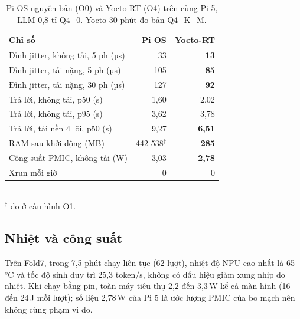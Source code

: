 \documentclass[a4paper,12pt,twocolumn]{article}
\begin{document}
\begin{table}[t]\centering\small
\caption{Pi OS nguyên bản (O0) và Yocto-RT (O4) trên cùng Pi 5, LLM 0,8 tỉ Q4\_0. Yocto 30 phút đo bản Q4\_K\_M.}\label{tab:os}
\setlength{\tabcolsep}{3pt}\footnotesize
\begin{tabular}{@{}lrr@{}}\toprule
Chỉ số & Pi OS & Yocto-RT\\\midrule
Đỉnh jitter, không tải, 5 ph (µs) & 33 & \textbf{13}\\
Đỉnh jitter, tải nặng, 5 ph (µs) & 105 & \textbf{85}\\
Đỉnh jitter, tải nặng, 30 ph (µs) & 127 & \textbf{92}\\
Trả lời, không tải, p50 (s) & 1,60 & 2,02\\
Trả lời, không tải, p95 (s) & 3,62 & 3,78\\
Trả lời, tải nền 4 lõi, p50 (s) & 9,27 & \textbf{6,51}\\
RAM sau khởi động (MB) & 442-538$^{\dagger}$ & \textbf{285}\\
Công suất PMIC, không tải (W) & 3,03 & \textbf{2,78}\\
Xrun mỗi giờ & 0 & 0\\\bottomrule
\end{tabular}\\[1pt]
{\footnotesize $^{\dagger}$ đo ở cấu hình O1.}
\end{table}



\subsection{Nhiệt và công suất}
Trên Fold7, trong 7,5 phút chạy liên tục (62 lượt), nhiệt độ NPU cao nhất là 65\,°C và tốc độ sinh duy trì 25,3 token/s, không có dấu hiệu giảm xung nhịp do nhiệt. Khi chạy bằng pin, toàn máy tiêu thụ 2,2 đến 3,3\,W kể cả màn hình (16 đến 24\,J mỗi lượt); số liệu 2,78\,W của Pi 5 là ước lượng PMIC của bo mạch nên không cùng phạm vi đo.
\end{document}
